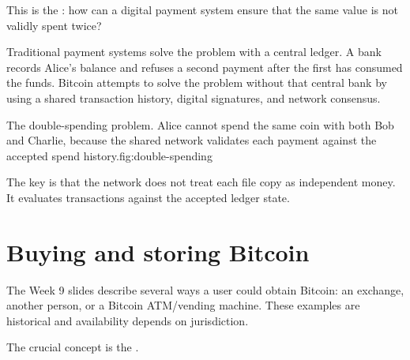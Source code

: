 This is the : how can a digital payment system ensure that the same value is not validly spent twice?

Traditional payment systems solve the problem with a central ledger. A bank records Alice's balance and refuses a second payment after the first has consumed the funds. Bitcoin attempts to solve the problem without that central bank by using a shared transaction history, digital signatures, and network consensus.

\begin{utpfig}{The double-spending problem. Alice cannot spend the same coin with both Bob and Charlie, because the shared network validates each payment against the accepted spend history.}{fig:double-spending}
\end{utpfig}

The key is that the network does not treat each file copy as independent money. It evaluates transactions against the accepted ledger state.

\section{Buying and storing Bitcoin}

The Week 9 slides describe several ways a user could obtain Bitcoin: an exchange, another person, or a Bitcoin ATM/vending machine. These examples are historical and availability depends on jurisdiction.

The crucial concept is the .

